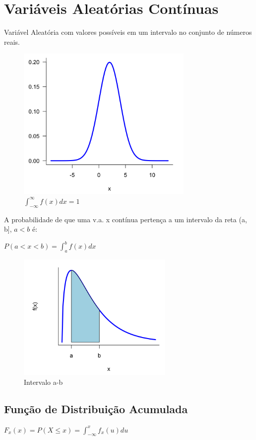 \documentclass[a4paper, 12pt]{article}
\begin{document}
\section{Variáveis Aleatórias Contínuas}
Variável Aleatória com valores possíveis em um intervalo no conjunto de números reais.
	
	\begin{figure}[h]
		\centering
		\includegraphics[width=0.5\linewidth]{imagens/vac}
		\caption{$\int_{-\infty}^{\infty} f(x)dx = 1$}
		\label{fig:vac}
	\end{figure}
	
	A probabilidade de que uma v.a. x contínua pertença a um intervalo da reta (a, b], $a < b$ é:
	
	\begin{center}
		\Large
		$
		P(a<x<b) = \int_{a}^{b} f(x)dx
		$
	\end{center}
	\begin{figure}[h]
		\centering
		\includegraphics[width=0.5\linewidth]{imagens/vac1}
		\caption{Intervalo a-b}
		\label{fig:vac1}
	\end{figure}
	
\subsection{Função de Distribuição Acumulada}
	\begin{center}
		\Large
		$
		F_{x}(x) = P(X\leq x) = \int_{-\infty}^{x} f_{x}(u)du
		$
	\end{center}
	
\end{document}
